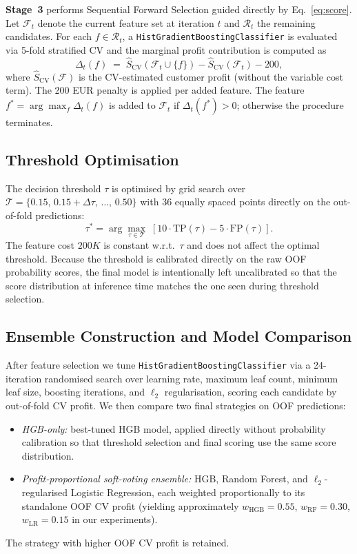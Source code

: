 \documentclass[11pt,a4paper]{article}
\begin{document}
\textbf{Stage~3} performs Sequential Forward Selection guided directly by
Eq.~\eqref{eq:score}. Let $\mathcal{F}_t$ denote the current feature set at iteration $t$ and
$\mathcal{R}_t$ the remaining candidates. For each $f \in \mathcal{R}_t$, a
\texttt{HistGradientBoostingClassifier} is evaluated via 5-fold stratified CV and the marginal
profit contribution is computed as
\begin{equation}
    \Delta_t(f) \;=\; \hat{S}_{\mathrm{CV}}(\mathcal{F}_t \cup \{f\}) - \hat{S}_{\mathrm{CV}}(\mathcal{F}_t) - 200,
    \label{eq:delta}
\end{equation}
where $\hat{S}_{\mathrm{CV}}(\mathcal{F})$ is the CV-estimated customer profit (without the
variable cost term). The 200 EUR penalty is applied per added feature.
The feature $f^* = \arg\max_f \Delta_t(f)$ is added to $\mathcal{F}_t$ if $\Delta_t(f^*)>0$;
otherwise the procedure terminates.

\subsection{Threshold Optimisation}

The decision threshold $\tau$ is optimised by grid search over
$\mathcal{T} = \{0.15,\, 0.15 + \Delta\tau,\, \ldots,\, 0.50\}$ with 36 equally spaced points
directly on the out-of-fold predictions:
\begin{equation}
    \tau^* = \arg\max_{\tau \in \mathcal{T}}\; [10\cdot\mathrm{TP}(\tau) - 5\cdot\mathrm{FP}(\tau)].
    \label{eq:threshold}
\end{equation}
The feature cost $200K$ is constant w.r.t.\ $\tau$ and does not affect the optimal threshold.
Because the threshold is calibrated directly on the raw OOF probability scores, the final model
is intentionally left uncalibrated so that the score distribution at inference time matches the
one seen during threshold selection.

\subsection{Ensemble Construction and Model Comparison}

After feature selection we tune \texttt{HistGradientBoostingClassifier} via a 24-iteration
randomised search over learning rate, maximum leaf count, minimum leaf size, boosting
iterations, and $\ell_2$ regularisation, scoring each candidate by out-of-fold CV profit.
We then compare two final strategies on OOF predictions:
\begin{itemize}
    \item \emph{HGB-only:} best-tuned HGB model, applied directly without probability calibration
          so that threshold selection and final scoring use the same score distribution.
    \item \emph{Profit-proportional soft-voting ensemble:} HGB, Random Forest, and
          $\ell_2$-regularised Logistic Regression, each weighted proportionally to its
          standalone OOF CV profit (yielding approximately $w_\text{HGB}{=}0.55$,
          $w_\text{RF}{=}0.30$, $w_\text{LR}{=}0.15$ in our experiments).
\end{itemize}
The strategy with higher OOF CV profit is retained.
\end{document}
